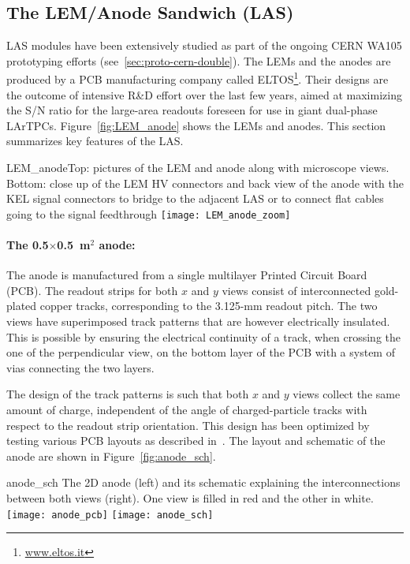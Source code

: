 \subsection{The LEM/Anode Sandwich (LAS)}

LAS modules have been extensively studied as part of the ongoing CERN WA105 prototyping efforts (see~\ref{sec:proto-cern-double}). The LEMs and the anodes are produced by a PCB  manufacturing company called ELTOS\footnote{\url{www.eltos.it}}. Their designs are the outcome of intensive R\&D effort over the last few years, aimed at maximizing the S/N ratio for the large-area readouts foreseen for use in  giant dual-phase LArTPCs.  Figure~\ref{fig:LEM_anode} shows the LEMs and anodes.  This section summarizes key features of the LAS.

\begin{cdrfigure}
{LEM_anode}{Top: pictures of the LEM and anode along with microscope
  views. Bottom: close up of the LEM HV connectors and back view of the anode 
with the KEL signal connectors to bridge to the adjacent LAS or to connect 
flat cables going to the signal feedthrough}
 \texttt{[image: LEM\_anode\_zoom]}  
 \end{cdrfigure}


 \paragraph{The 0.5$\times$0.5~m$^2$ anode:}

The anode is manufactured from a single multilayer Printed Circuit Board (PCB). The readout strips for both $x$ and $y$ views  consist of
interconnected gold-plated copper tracks, corresponding  to the 3.125-mm readout pitch. The two views have superimposed track patterns that are however electrically insulated. This is possible by ensuring the electrical continuity of a track, when crossing the one of the perpendicular view, on the bottom layer of the PCB with a system of vias connecting the two layers. 

The design of the track patterns is such that both $x$ and $y$ views collect the same amount of charge, independent of the angle of charged-particle tracks with respect to the readout strip orientation. This design has been optimized by testing various PCB layouts  as described in~\cite{Cantini:2013yba}.  The layout and schematic of the anode are shown in Figure~\ref{fig:anode_sch}.

\begin{cdrfigure}{anode_sch}
{The 2D anode (left) and its schematic explaining the  interconnections 
between both views (right). One view is filled  in red and the other in white.}
\texttt{[image: anode\_pcb]} \hspace{0.2cm} \texttt{[image: anode\_sch]}
\end{cdrfigure}

